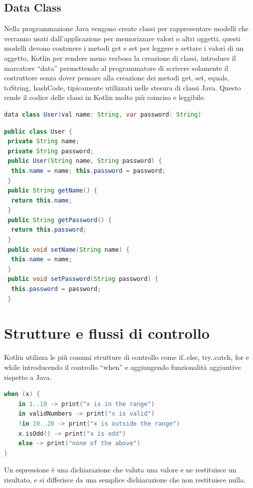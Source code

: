 \subsection{Data Class}

Nella programmazione Java vengono create classi per rappresentare modelli che verranno usati dall'applicazione per memorizzare valori o altri oggetti, questi modelli devono contenere i metodi get e set per leggere e settare i valori di un oggetto, Kotlin per rendere meno verbosa la creazione di classi, introduce il marcatore ``data'' permettendo al programmatore di scrivere solamente il costruttore senza dover pensare alla creazione dei metodi get, set, equals, toString, hashCode, tipicamente utilizzati nelle stesura di classi Java. Questo rende il codice delle classi in Kotlin molto più coinciso e leggibile.

\begin{lstlisting}[language=java,caption={Esempio Data Class in Kotlin}]
data class User(val name: String, var password: String)
\end{lstlisting}

\begin{lstlisting}[language=java,caption={Esempio classe in Java}]
public class User {
 private String name;
 private String password;
 public User(String name, String password) {
  this.name = name; this.password = password;
 }
 public String getName() {
  return this.name;
 }
 public String getPassword() {
  return this.password;
 }
 public void setName(String name) {
  this.name = name;
 }
 public void setPassword(String password) {
  this.password = password;
 }
\end{lstlisting}




\section{Strutture e flussi di controllo}
Kotlin utilizza le più comuni strutture di controllo come if..else, try..catch, for e while introducendo il controllo ``when'' e aggiungendo funzionalità aggiuntive rispetto a Java.

\begin{lstlisting}[language=kotlin,caption={Sintatti ``when'' in Kotlin}]
when (x) {
    in 1..10 -> print("x is in the range")
    in validNumbers -> print("x is valid")
    !in 10..20 -> print("x is outside the range")
    x.isOdd() -> print("x is odd")
    else -> print("none of the above")
}
\end{lstlisting}
Un espressione è una dichiarazione che valuta una valore e ne restituisce un risultato, e si differisce da una semplice dichiarazione che non restituisce nulla.

